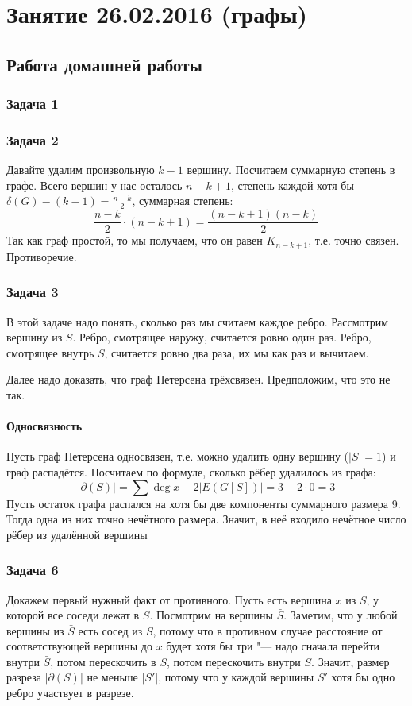 \chapter{Занятие 26.02.2016 (графы)}
\section{Работа домашней работы}
\subsection{Задача 1}
	\TODO

\subsection{Задача 2}
	Давайте удалим произвольную $k-1$ вершину.
	Посчитаем суммарную степень в графе.
	Всего вершин у нас осталось $n-k+1$, степень каждой хотя бы $\delta(G)-(k-1)=\frac{n-k}{2}$,
	суммарная степень:
	\[ \frac{n-k}{2} \cdot (n-k+1) = \frac{(n-k+1)(n-k)}{2} \]
	Так как граф простой, то мы получаем, что он равен $K_{n-k+1}$, т.е. точно связен.
	Противоречие.

\subsection{Задача 3}
	В этой задаче надо понять, сколько раз мы считаем каждое ребро.
	Рассмотрим вершину из $S$.
	Ребро, смотрящее наружу, считается ровно один раз.
	Ребро, смотрящее внутрь $S$, считается ровно два раза, их мы как раз и вычитаем.

	Далее надо доказать, что граф Петерсена трёхсвязен.
	Предположим, что это не так.
	\subsubsection{Односвязность}
		Пусть граф Петерсена односвязен, т.е. можно удалить одну вершину ($|S|=1$) и граф распадётся.
		Посчитаем по формуле, сколько рёбер удалилось из графа:
		\[ |\partial(S)| = \sum \deg x - 2|E(G[S])| = 3 - 2 \cdot 0 = 3 \]
		Пусть остаток графа распался на хотя бы две компоненты суммарного размера 9.
		Тогда одна из них точно нечётного размера.
		Значит, в неё входило нечётное число рёбер из удалённой вершины
	\TODO

\subsection{Задача 6}
	Докажем первый нужный факт от противного.
	Пусть есть вершина $x$ из $S$, у которой все соседи лежат в $S$.
	Посмотрим на вершины $\bar S$.
	Заметим, что у любой вершины из $\bar S$ есть сосед из $S$, потому что в противном случае
	расстояние от соответствующей вершины до $x$ будет хотя бы три "--- надо сначала
	перейти внутри $\bar S$, потом перескочить в $S$, потом перескочить внутри $S$.
	Значит, размер разреза $|\partial(S)|$ не меньше $|S'|$, потому что у каждой вершины $S'$
	хотя бы одно ребро участвует в разрезе.

